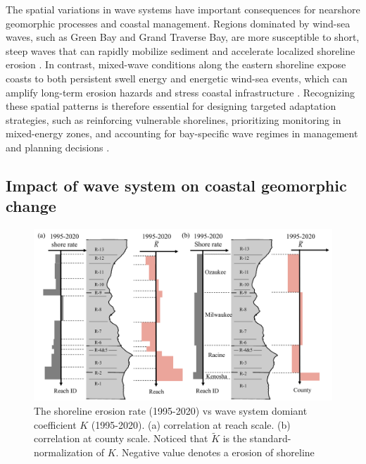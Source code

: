 The spatial variations in wave systems have important consequences for nearshore
geomorphic processes and coastal management. Regions dominated by wind-sea
waves, such as Green Bay and Grand Traverse Bay, are more susceptible to short,
steep waves that can rapidly mobilize sediment and accelerate localized
shoreline erosion \citep{voulgaris2000sediment,green2014review}. In contrast,
mixed-wave conditions along the eastern shoreline expose coasts to both
persistent swell energy and energetic wind-sea events, which can amplify
long-term erosion hazards and stress coastal infrastructure
\citep{mattheus2025response,extreme_Masselink_2016,barnard2017extreme}.
Recognizing these spatial patterns is therefore essential for designing targeted
adaptation strategies, such as reinforcing vulnerable shorelines, prioritizing
monitoring in mixed-energy zones, and accounting for bay-specific wave regimes
in management and planning decisions \citep{zhu_trends_2024}.

\subsection{Impact of wave system on coastal geomorphic change}
\label{Impact of wave system on coastal geomorphic change}

\begin{figure}[htbp]
  \centering
  \includegraphics[width=1\textwidth]{chapter4/resources/nearshore_correlation.png}
  \caption{The shoreline erosion rate (1995-2020) vs wave system domiant
  coefficient $K$ (1995-2020). (a) correlation at reach scale. (b) correlation
  at county scale. Noticed that $\widetilde{K}$ is the standard-normalization of
  $K$. Negative value denotes a erosion of shoreline}
  \label{fig:nearshore_cor}
\end{figure}

